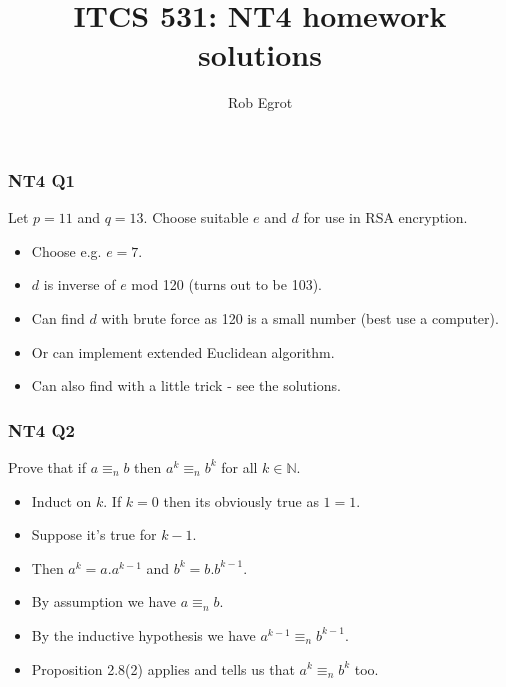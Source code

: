 \documentclass[handout]{beamer}
\title{ITCS 531: NT4 homework solutions}
\date{}
\author{Rob Egrot}
\newcommand{\bN}{\mathbb{N}}
\begin{document}
\begin{frame}
\titlepage
\end{frame}

\begin{frame}
\frametitle{NT4 Q1}
Let $p =11$ and $q=13$. Choose suitable $e$ and $d$ for use in RSA encryption.
\vspace{0.5cm}
\begin{itemize}
\item Choose e.g. $e = 7$.
\vspace{0.5cm}
\item $d$ is inverse of $e$ mod 120 (turns out to be 103).
\vspace{0.5cm}
\item Can find $d$ with brute force as 120 is a small number (best use a computer).
\vspace{0.5cm}
\item Or can implement extended Euclidean algorithm.
\vspace{0.5cm}
\item Can also find with a little trick - see the solutions. 
\end{itemize}
\end{frame}

\begin{frame}
\frametitle{NT4 Q2}
Prove that if $a\equiv_n b$ then $a^k\equiv_n b^k$ for all $k\in\bN$.
\vspace{0.5cm}
\begin{itemize}
\item Induct on $k$. If $k=0$ then its obviously true as $1=1$. 
\vspace{0.3cm}
\item Suppose it's true for $k-1$. 
\vspace{0.3cm}
\item Then $a^k = a.a^{k-1}$ and $b^k = b.b^{k-1}$.
\vspace{0.3cm} 
\item By assumption we have $a \equiv_n b$. 
\vspace{0.3cm}
\item By the inductive hypothesis we have $a^{k-1}\equiv_n b^{k-1}$. 
\vspace{0.3cm}
\item Proposition 2.8(2) applies and tells us that $a^k\equiv_n b^k$ too.
\end{itemize}
\end{frame}
\end{document}

